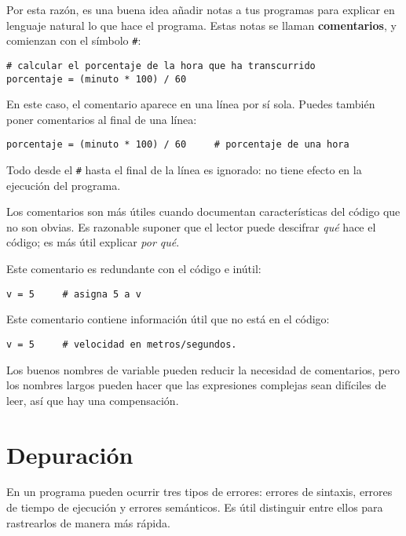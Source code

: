 \documentclass[10pt]{book}
\begin{document}
Por esta razón, es una buena idea añadir notas a tus programas para explicar
en lenguaje natural lo que hace el programa.  Estas notas se llaman
{\bf comentarios}, y comienzan con el símbolo \verb"#":

\begin{verbatim}
# calcular el porcentaje de la hora que ha transcurrido
porcentaje = (minuto * 100) / 60
\end{verbatim}
%
En este caso, el comentario aparece en una línea por sí sola.  Puedes también poner
comentarios al final de una línea:

\begin{verbatim}
porcentaje = (minuto * 100) / 60     # porcentaje de una hora
\end{verbatim}
%
Todo desde el {\tt \#} hasta el final de la línea es ignorado: no
tiene efecto en la ejecución del programa.

Los comentarios son más útiles cuando documentan características del
código que no son obvias.  Es razonable suponer que el lector puede descifrar
{\em qué} hace el código; es más útil explicar {\em por qué}.

Este comentario es redundante con el código e inútil:

\begin{verbatim}
v = 5     # asigna 5 a v
\end{verbatim}
%
Este comentario contiene información útil que no está en el código:

\begin{verbatim}
v = 5     # velocidad en metros/segundos.
\end{verbatim}
%
Los buenos nombres de variable pueden reducir la necesidad de comentarios, pero
los nombres largos pueden hacer que las expresiones complejas sean difíciles de leer,
así que hay una compensación.


\section{Depuración}

En un programa pueden ocurrir tres tipos de errores: errores de sintaxis, errores
de tiempo de ejecución y errores semánticos.  Es útil
distinguir entre ellos para rastrearlos de manera más rápida.
\end{document}
